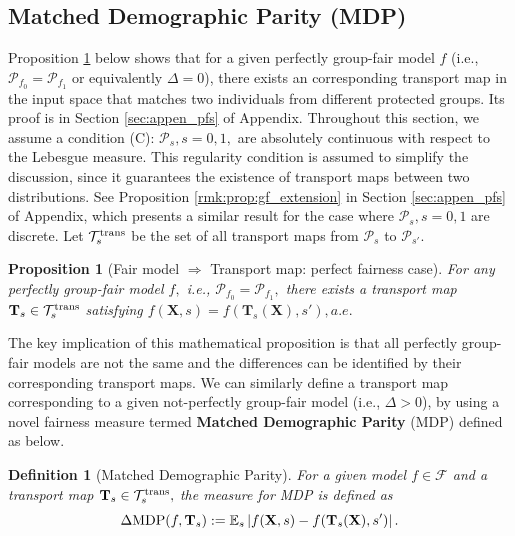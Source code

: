 \documentclass[10pt]{article} %
\newtheorem{proposition}[theorem]{Proposition}
\newtheorem{definition}[theorem]{Definition}
\begin{document}
\subsection{Matched Demographic Parity (MDP)}\label{sec:mdp}

Proposition \ref{prop:perfect} below shows that for a given perfectly group-fair model $f$ (i.e., $\mathcal{P}_{f_{0}} = \mathcal{P}_{f_{1}}$ or equivalently $\Delta = 0$), there exists an corresponding transport map in the input space that matches two individuals from different protected groups.
Its proof is in Section \ref{sec:appen_pfs} of Appendix.
Throughout this section, we assume a condition (C): $\mathcal{P}_{s}, s=0,1,$ are absolutely continuous with respect to the Lebesgue measure.
This regularity condition is assumed to simplify the discussion, since it guarantees the existence of transport maps between two distributions.
See Proposition \ref{rmk:prop:gf_extension} in Section \ref{sec:appen_pfs} of Appendix, which presents a similar result for the case where $\mathcal{P}_{s}, s = 0, 1$ are discrete.
Let $\mathcal{T}_{s}^{\textup{trans}}$ be the set of all transport maps from $\mathcal{P}_s$ to $\mathcal{P}_{s'}.$
\begin{proposition}[Fair model $\Rightarrow$ Transport map: perfect fairness case]\label{prop:perfect}
    For any perfectly group-fair model $f,$ i.e., $\mathcal{P}_{f_{0}} = \mathcal{P}_{f_{1}},$
    there exists a transport map $\mathbf{T}_{s} \in \mathcal{T}_{s}^{\textup{trans}}$ satisfying
    $
    f \left( \mathbf{X}, s \right) = f \left( \mathbf{T}_{s} (\mathbf{X}), s' \right), a.e.
    $
\end{proposition}

The key implication of this {mathematical} proposition is that all perfectly group-fair models are not the same and the differences can be identified by their corresponding transport maps.
We can similarly define a transport map corresponding to a given not-perfectly group-fair model (i.e., $\Delta > 0$), by using a novel fairness measure termed \textbf{Matched Demographic Parity} (MDP) defined as below.


\begin{definition}[Matched Demographic Parity]
    For a given model $f \in \mathcal{F}$ and a transport map $\mathbf{T}_{s} \in \mathcal{T}_{s}^\textup{trans},$
    the measure for MDP is defined as
    \begin{equation}\label{eq:mdp}
        \Delta \textup{MDP} (f, \mathbf{T}_{s}) := \mathbb{E}_{s} \left\vert f(\mathbf{X}, s) - f(\mathbf{T}_{s}(\mathbf{X}), s') \right\vert.
    \end{equation}
\end{definition}
\end{document}
